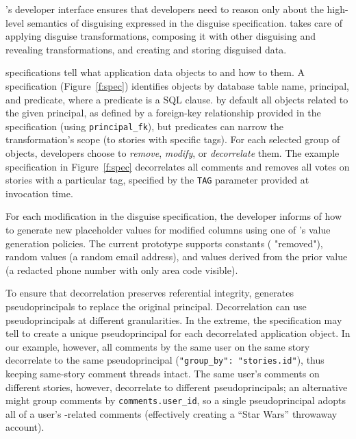 \sys's developer interface ensures that developers need to reason only
about the high-level semantics of disguising expressed in the disguise
specification. \sys takes care of applying disguise transformations, composing
it with other disguising and revealing transformations, and creating and storing
disguised data.


\Xx specifications tell \sys what application data objects to \xx and how to \xx them.
%
A \xx specification (Figure~\ref{f:spec}) identifies objects by database table name, principal, and
predicate, where a predicate is a SQL  clause.
%
\sys by default \xxs all objects related to the given principal, as defined by
a foreign-key relationship provided in the \xx specification (using
\texttt{principal\_fk}), but predicates can narrow the transformation's scope
(\eg to stories with specific tags).
%
For each selected group of objects, developers choose to
\emph{remove}, \emph{modify}, or \emph{decorrelate} them.
%
The example specification in Figure~\ref{f:spec} decorrelates all comments and
removes all votes on stories with a particular tag, specified by the
\texttt{TAG} parameter provided at invocation time.
%
%

%
For each modification in the disguise specification, the developer informs \sys
of how to generate new placeholder values for modified columns using one of
\sys's value generation policies. The current prototype supports constants (\eg
"removed"), random values (\eg a random email address), and values derived from
the prior value (\eg a redacted phone number with only area code visible).
%

%
To ensure that decorrelation preserves referential integrity, \sys generates
pseudoprincipals to replace the original principal. 
%
Decorrelation can use pseudoprincipals at different granularities.  In the
extreme, the \xx specification may tell \sys to create a unique pseudoprincipal
for each decorrelated application object.  In our example, however, all comments
by the same user on the same story decorrelate to the same pseudoprincipal
(\verb+"group_by": "stories.id"+), thus keeping same-story comment threads
intact.
%
The same user's comments on different stories, however, decorrelate to different
pseudoprincipals; an alternative might group comments by
\texttt{comments.user\_id}, so a single pseudoprincipal adopts all of a user's
-related comments (effectively creating a ``Star Wars'' throwaway
account).


